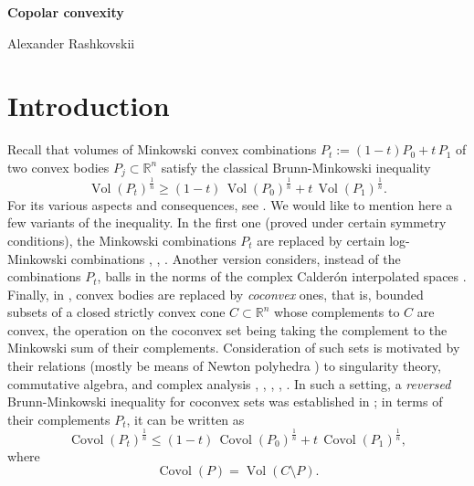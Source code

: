 \documentclass[12pt]{article}
\newcommand{\beq}{\begin{equation}}
\newcommand{\eeq}{\end{equation}}
\numberwithin{equation}{section}
\newcommand{\Vol}{{\operatorname{Vol}}}
\newcommand{\Covol}{{\operatorname{Covol}}}
\newcommand{\Rn}{{\mathbb R}^n}
\begin{document}
\begin{center}
{\Large\bf Copolar convexity}
\end{center}

\begin{center}
{\large Alexander Rashkovskii}
\end{center}

\vskip1cm

\begin{abstract}
We introduce a new operation, {\it copolar addition}, on unbounded convex subsets of the positive orthant of $\Rn$ and establish convexity of the covolumes of the corresponding convex combinations. The proof is based on a technique of geodesics of plurisubharmonic functions. As an application, we show that there are no relative extremal functions inside a non-constant geodesic curve between two toric relative extremal functions.

\medskip\noindent
{\sl Mathematic Subject Classification}: 32U15, 32U20, 52A20, 52A39
\end{abstract}

\section{Introduction}
Recall that volumes of Minkowski convex combinations $P_t:=(1-t)P_0+t\,P_1$ of two convex bodies $P_j\subset \Rn$  satisfy
the classical Brunn-Minkowski inequality
$$\Vol(P_t)^{\frac1n} \ge (1-t)\,\Vol(P_0)^{\frac1n}+t\,\Vol(P_1)^{\frac1n}.$$
 For its various aspects and consequences, see \cite{Gar}.
We would like to mention here a few variants of the inequality. In the first one (proved under certain symmetry conditions),  the Minkowski combinations $P_t$ are replaced by certain {log-Minkowski combinations} \cite{BLYZ}, \cite{Sa}, \cite{XL}.
Another version considers, instead of the combinations $P_t$, balls in the norms of the complex Calder\'{o}n interpolated spaces \cite{CE}. Finally,
in \cite{KT}, convex bodies are replaced by {\it coconvex} ones, that is, bounded subsets of a closed strictly convex cone $C\subset\Rn$ whose complements to $C$ are convex, the operation on the coconvex set being taking the complement to the Minkowski sum of their complements. Consideration of such sets is motivated by their relations (mostly be means of Newton polyhedra \cite{Ku1}) to singularity theory, commutative algebra, and complex analysis \cite{KaK}, \cite{KV}, \cite{R3}, \cite{R4}, \cite{R9}.
In such a setting,  a {\sl reversed} Brunn-Minkowski inequality for coconvex sets was established in \cite{KT}; in terms of their complements $P_t$, it can be written as \beq\label{rBM}\Covol(P_t)^{\frac1n} \le (1-t)\,\Covol(P_0)^{\frac1n}+t\,\Covol(P_1)^{\frac1n},\eeq
where
\beq\label{covol} \Covol(P)=\Vol(C\setminus P).\eeq
\end{document}
